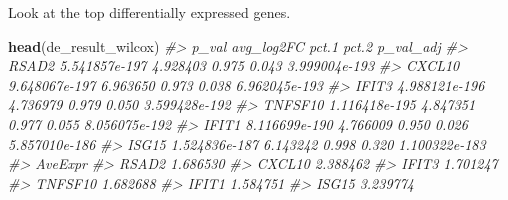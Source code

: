 \documentclass[
]{book}
\newenvironment{Shaded}{\begin{snugshade}}{\end{snugshade}}
\newcommand{\CommentTok}[1]{\textcolor[rgb]{0.56,0.35,0.01}{\textit{#1}}}
\newcommand{\FunctionTok}[1]{\textcolor[rgb]{0.13,0.29,0.53}{\textbf{#1}}}
\newcommand{\NormalTok}[1]{#1}
\begin{document}
Look at the top differentially expressed genes.

\begin{Shaded}
\begin{Highlighting}[]
\FunctionTok{head}\NormalTok{(de\_result\_wilcox)}
\CommentTok{\#\textgreater{}                 p\_val avg\_log2FC pct.1 pct.2     p\_val\_adj}
\CommentTok{\#\textgreater{} RSAD2   5.541857e{-}197   4.928403 0.975 0.043 3.999004e{-}193}
\CommentTok{\#\textgreater{} CXCL10  9.648067e{-}197   6.963650 0.973 0.038 6.962045e{-}193}
\CommentTok{\#\textgreater{} IFIT3   4.988121e{-}196   4.736979 0.979 0.050 3.599428e{-}192}
\CommentTok{\#\textgreater{} TNFSF10 1.116418e{-}195   4.847351 0.977 0.055 8.056075e{-}192}
\CommentTok{\#\textgreater{} IFIT1   8.116699e{-}190   4.766009 0.950 0.026 5.857010e{-}186}
\CommentTok{\#\textgreater{} ISG15   1.524836e{-}187   6.143242 0.998 0.320 1.100322e{-}183}
\CommentTok{\#\textgreater{}          AveExpr}
\CommentTok{\#\textgreater{} RSAD2   1.686530}
\CommentTok{\#\textgreater{} CXCL10  2.388462}
\CommentTok{\#\textgreater{} IFIT3   1.701247}
\CommentTok{\#\textgreater{} TNFSF10 1.682688}
\CommentTok{\#\textgreater{} IFIT1   1.584751}
\CommentTok{\#\textgreater{} ISG15   3.239774}
\end{Highlighting}
\end{Shaded}
\end{document}
